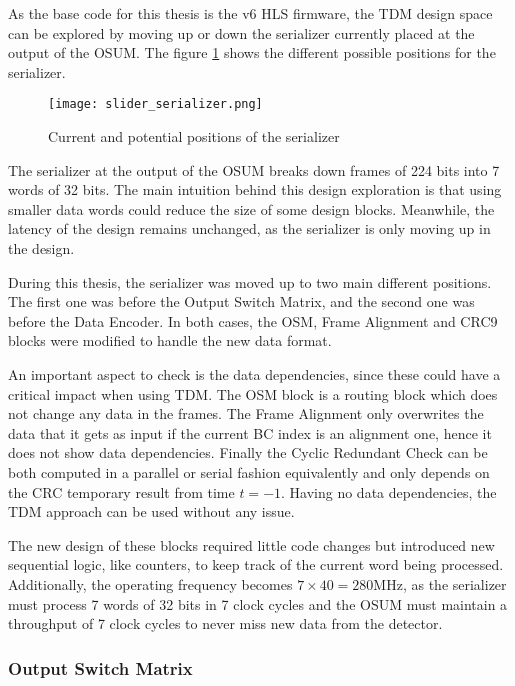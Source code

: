 As the base code for this thesis is the v6 HLS firmware, the TDM design space can be explored by moving up or down the serializer currently placed at the output of the OSUM. The figure \ref{fig:slider-serializer} shows the different possible positions for the serializer. 

\begin{figure}
    \centering
    \texttt{[image: slider\_serializer.png]}
    \caption{Current and potential positions of the serializer}
    \label{fig:slider-serializer}
\end{figure}

The serializer at the output of the OSUM breaks down frames of 224 bits into 7 words of 32 bits. The main intuition behind this design exploration is that using smaller data words could reduce the size of some design blocks. Meanwhile, the latency of the design remains unchanged, as the serializer is only moving up in the design.

During this thesis, the serializer was moved up to two main different positions. The first one was before the Output Switch Matrix, and the second one was before the Data Encoder. In both cases, the OSM, Frame Alignment and CRC9 blocks were modified to handle the new data format. 

An important aspect to check is the data dependencies, since these could have a critical impact when using TDM. The OSM block is a routing block which does not change any data in the frames. The Frame Alignment only overwrites the data that it gets as input if the current BC index is an alignment one, hence it does not show data dependencies. Finally the Cyclic Redundant Check can be both computed in a parallel or serial fashion equivalently and only depends on the CRC temporary result from time \(t=-1\). Having no data dependencies, the TDM approach can be used without any issue.

The new design of these blocks required little code changes but introduced new sequential logic, like counters, to keep track of the current word being processed. Additionally, the operating frequency becomes \(7\times40=280\)MHz, as the serializer must process 7 words of 32 bits in 7 clock cycles and the OSUM must maintain a throughput of 7 clock cycles to never miss new data from the detector.

\subsubsection{Output Switch Matrix}

